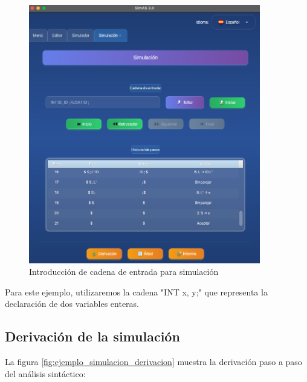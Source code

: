 \needspace{8cm}
\begin{figure}[H]
    \centering
    \includegraphics[width=0.9\textwidth]{figuras/ejemplo_practico/simulacion_cadena1.png}
    \caption{Introducción de cadena de entrada para simulación}
    \label{fig:ejemplo_simulacion_cadena}
\end{figure}

Para este ejemplo, utilizaremos la cadena \string"INT x, y;\string" que representa la declaración de dos variables enteras.

\subsection{Derivación de la simulación}

La figura \ref{fig:ejemplo_simulacion_derivacion} muestra la derivación paso a paso del análisis sintáctico:

